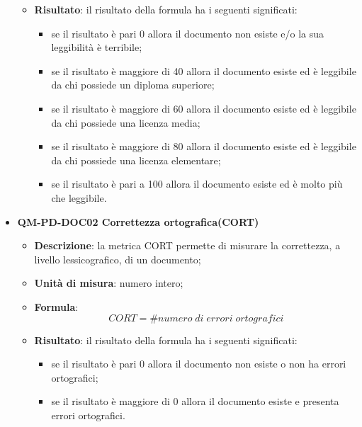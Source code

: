 \begin{itemize}
\begin{itemize}
                            \item\textbf{Risultato}: il risultato della formula ha i seguenti significati:
                                \begin{itemize}
                                    \item se il risultato è pari 0 allora il documento non esiste e/o la sua leggibilità è terribile;
                                    \item se il risultato è maggiore di 40 allora il documento esiste ed è leggibile da chi possiede un diploma superiore;
                                    \item se il risultato è maggiore di 60 allora il documento esiste ed è leggibile da chi possiede una licenza media;
                                    \item se il risultato è maggiore di 80 allora il documento esiste ed è leggibile da chi possiede una licenza elementare;
                                    \item se il risultato è pari a 100 allora il documento esiste ed è molto più che leggibile.
                                \end{itemize}
                        \end{itemize}
                    \item\textbf{QM-PD-DOC02 Correttezza ortografica(CORT)} 
                        \begin{itemize}
                            \item\textbf{Descrizione}: la metrica CORT permette di misurare la correttezza, a livello lessicografico, di un documento;
                            \item\textbf{Unità di misura}: numero intero;
                            \item\textbf{Formula}: \\
                                \[CORT = \# \mathit{numero\;di\;errori\;ortografici}\]
                            \item\textbf{Risultato}: il risultato della formula ha i seguenti significati:
                                \begin{itemize}
                                    \item se il risultato è pari 0 allora il documento non esiste o non ha errori ortografici;
                                    \item se il risultato è maggiore di 0 allora il documento esiste e presenta errori ortografici.
                                \end{itemize}
                        \end{itemize}
                \end{itemize}
